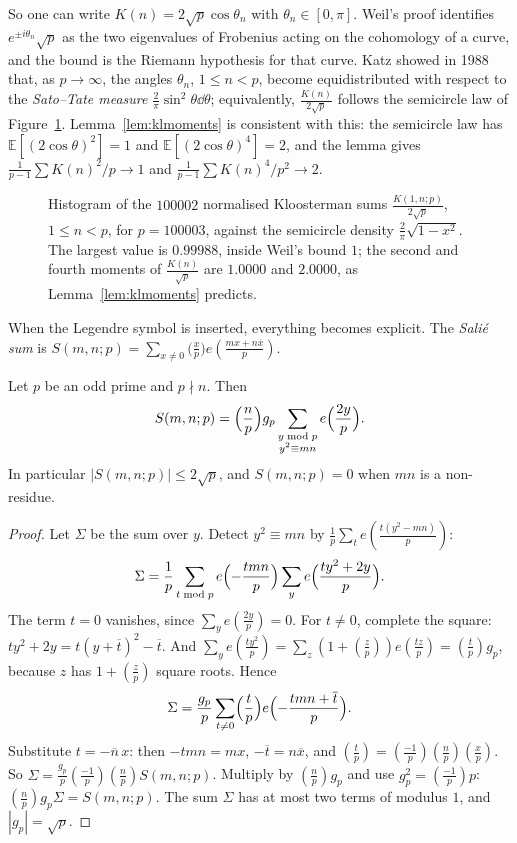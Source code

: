 So one can write $K(n)=2\sqrt p\cos\theta_n$ with $\theta_n\in[0,\pi]$. Weil's proof identifies $e^{\pm i\theta_n}\sqrt p$ as the two eigenvalues of Frobenius acting on the cohomology of a curve, and the bound is the Riemann hypothesis for that curve. Katz showed in 1988 that, as $p\to\infty$, the angles $\theta_n$, $1\le n<p$, become equidistributed with respect to the \emph{Sato--Tate measure} $\frac2\pi\sin^2\theta\dd\theta$; equivalently, $\frac{K(n)}{2\sqrt p}$ follows the semicircle law of Figure~\ref{fig:kloosterman}. Lemma~\ref{lem:klmoments} is consistent with this: the semicircle law has $\mathbb E[(2\cos\theta)^2]=1$ and $\mathbb E[(2\cos\theta)^4]=2$, and the lemma gives $\frac1{p-1}\sum K(n)^2/p\to1$ and $\frac1{p-1}\sum K(n)^4/p^2\to2$.

\begin{figure}[ht]
\centering
{}
\caption{Histogram of the $100002$ normalised Kloosterman sums $\frac{K(1,n;p)}{2\sqrt p}$, $1\le n<p$, for $p=100003$, against the semicircle density $\frac2\pi\sqrt{1-x^2}$. The largest value is $0.99988$, inside Weil's bound $1$; the second and fourth moments of $\frac{K(n)}{\sqrt p}$ are $1.0000$ and $2.0000$, as Lemma~\ref{lem:klmoments} predicts.}
\label{fig:kloosterman}
\end{figure}

When the Legendre symbol is inserted, everything becomes explicit. The \emph{Salié sum} is $S(m,n;p)=\sum_{x\ne0}\bigl(\frac xp\bigr)e(\frac{mx+n\overline x}p)$.

\begin{theorem}[Salié, 1932]\label{thm:salie}
Let $p$ be an odd prime and $p\nmid n$. Then
\[
S(m,n;p)=\Bigl(\frac np\Bigr)g_p\sum_{\substack{y\bmod p\\y^2\equiv mn}}e\Bigl(\frac{2y}p\Bigr).
\]
In particular $|S(m,n;p)|\le2\sqrt p$, and $S(m,n;p)=0$ when $mn$ is a non-residue.
\end{theorem}
\begin{proof}
Let $\Sigma$ be the sum over $y$. Detect $y^2\equiv mn$ by $\frac1p\sum_te(\frac{t(y^2-mn)}p)$:
\[
\Sigma=\frac1p\sum_{t\bmod p}e\Bigl(-\frac{tmn}p\Bigr)\sum_ye\Bigl(\frac{ty^2+2y}p\Bigr).
\]
The term $t=0$ vanishes, since $\sum_ye(\frac{2y}p)=0$. For $t\ne0$, complete the square: $ty^2+2y=t(y+\overline t)^2-\overline t$. And $\sum_ye(\frac{ty^2}p)=\sum_z(1+(\frac zp))e(\frac{tz}p)=(\frac tp)g_p$, because $z$ has $1+(\frac zp)$ square roots. Hence
\[
\Sigma=\frac{g_p}p\sum_{t\ne0}\Bigl(\frac tp\Bigr)e\Bigl(-\frac{tmn+\overline t}p\Bigr).
\]
Substitute $t=-\overline n\,x$: then $-tmn=mx$, $-\overline t=n\overline x$, and $(\frac tp)=(\frac{-1}p)(\frac np)(\frac xp)$. So $\Sigma=\frac{g_p}p(\frac{-1}p)(\frac np)S(m,n;p)$. Multiply by $(\frac np)g_p$ and use $g_p^2=(\frac{-1}p)p$: $(\frac np)g_p\Sigma=S(m,n;p)$. The sum $\Sigma$ has at most two terms of modulus $1$, and $|g_p|=\sqrt p$.
\end{proof}


